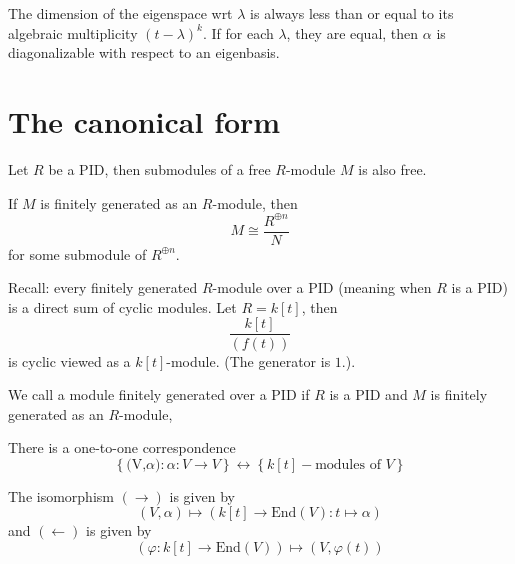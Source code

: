 \documentclass[openany]{book}
\begin{document}
\begin{prop}
    The dimension of the eigenspace wrt $\lambda$ is always less than or equal to its algebraic multiplicity $(t-\lambda)^k$. If for each $\lambda$, they are equal, then $\alpha$ is diagonalizable with respect to an eigenbasis.
\end{prop}

\section{The canonical form}


\begin{prop}
    Let $R$ be a PID, then submodules of a free $R$-module $M$ is also free.
\end{prop}

\begin{prop}
    If $M$ is finitely generated as an $R$-module, then 
    \begin{equation*}
        M\cong\frac{R^{\oplus n}}{N}
    \end{equation*}
    for some submodule of $R^{\oplus n}$.
\end{prop}
\begin{prop}
    Recall: every finitely generated $R$-module over a PID (meaning when $R$ is a PID) is a direct sum of cyclic modules. Let $R=k[t]$, then
    \begin{equation*}
        \frac{k[t]}{(f(t))}
    \end{equation*}
    is cyclic viewed as a $k[t]$-module. (The generator is $1$.).
\end{prop}

\begin{prop}
    We call a module finitely generated over a PID if $R$ is a PID and $M$ is finitely generated as an $R$-module, 
\end{prop}

\begin{prop}
    There is a one-to-one correspondence 
    \begin{equation*}
        \left\{\text{(V,$\alpha$)}: \alpha:V\to V\right\}\leftrightarrow \left\{k[t]-\text{modules of } V\right\}
    \end{equation*}
\end{prop}
The isomorphism $(\rightarrow)$ is given by 
\begin{equation*}
    (V,\alpha)\mapsto (k[t]\to\text{End}(V): t\mapsto\alpha)
\end{equation*}
and $(\leftarrow)$ is given by 
\begin{equation*}
    \left(\varphi:k[t]\to\text{End}(V)\right)\mapsto (V,\varphi(t))
\end{equation*}
\end{document}

